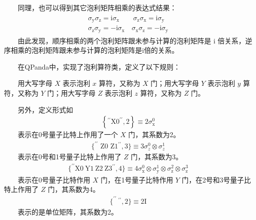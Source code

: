 \documentclass[a4paper,11pt,english]{sphinxmanual}
\begin{document}
\sphinxAtStartPar
  同理，也可以得到其它泡利矩阵相乘的表达式结果：
\begin{equation*}
\begin{split}\begin{aligned} \sigma_{\mathrm{y}} \sigma_{\mathrm{z}}=\mathrm{i} \sigma_{\mathrm{x}}\qquad \sigma_{\mathrm{z}} \sigma_{\mathrm{x}}=\mathrm{i} \sigma_{\mathrm{y}} \\ \sigma_{\mathrm{z}} \sigma_{\mathrm{y}}=-\mathrm{i} \sigma_{\mathrm{x}} \quad \sigma_{\mathrm{x}} \sigma_{\mathrm{z}}=-\mathrm{i} \sigma_{\mathrm{y}} \end{aligned}\end{split}
\end{equation*}
\sphinxAtStartPar
  由此发现，顺序相乘的两个泡利矩阵跟未参与计算的泡利矩阵是 \(\mathrm{i}\) 倍关系，逆序相乘的泡利矩阵跟未参与计算的泡利矩阵是\sphinxhyphen{}i倍的关系。

\sphinxAtStartPar
  在QPanda中，实现了泡利算符类，定义了以下规则：

\sphinxAtStartPar
  用大写字母 \(X\) 表示泡利 \(x\) 算符，又称为 \(X\) 门；用大写字母 \(Y\) 表示泡利 \(y\) 算符，又称为 \(Y\) 门；用大写字母 \(Z\) 表示泡利 \(z\) 算符，又称为 \(Z\) 门。

\sphinxAtStartPar
  另外，定义形式如
\begin{equation*}
\begin{split}\left \{ ^{\prime \prime}\mathrm{X} 0^{\prime \prime}, 2\right \} \equiv 2 \sigma_{\mathrm{x}}^{0}\end{split}
\end{equation*}
\sphinxAtStartPar
  表示在0号量子比特上作用了一个 \(X\) 门，其系数为2。
\begin{equation*}
\begin{split}\{ ^{\prime \prime} \text { Z0 Z1}^{\prime \prime} \text{} ,3\} \equiv 3 \sigma_{z}^{0} \otimes \sigma_{z}^{1}\end{split}
\end{equation*}
\sphinxAtStartPar
  表示在0号和1号量子比特上作用了 \(Z\) 门，其系数为3。
\begin{equation*}
\begin{split}\{^{\prime \prime}\mathrm{X} 0 \ \mathrm{Y} 1\ \mathrm{Z} 2\ \mathrm{Z} 3^{\prime \prime},4\} \equiv 4 \sigma_{\mathrm{x}}^{0} \otimes \sigma_{\mathrm{y}}^{1} \otimes \sigma_{\mathrm{z}}^{2} \otimes \sigma_{\mathrm{z}}^{3}\end{split}
\end{equation*}
\sphinxAtStartPar
  表示在0号量子比特作用 \(X\) 门，在1号量子比特作用 \(Y\) 门，在2号和3号量子比特上作用了 \(Z\) 门，其系数为4。
\begin{equation*}
\begin{split}\{^{\prime \prime}\ ^{\prime \prime}, 2\} \equiv 2 \mathrm{I}\end{split}
\end{equation*}
\sphinxAtStartPar
  表示的是单位矩阵，其系数为2。
\end{document}
